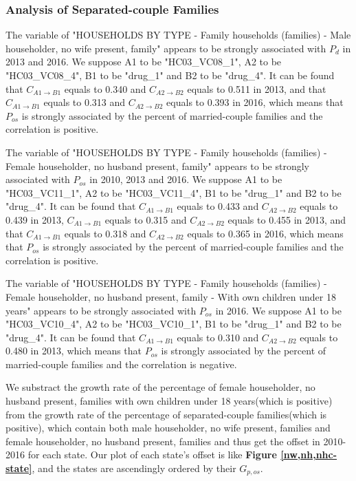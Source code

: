 \documentclass[12pt]{article}
\begin{document}
\subsubsection{Analysis of Separated-couple Families}
The variable of "HOUSEHOLDS BY TYPE - Family households (families) - Male householder, no wife present, family" appears to be strongly associated with $P_d$ in 2013 and 2016. We suppose A1 to be "HC03\_VC08\_1", A2 to be "HC03\_VC08\_4", B1 to be "drug\_1" and B2 to be "drug\_4". It can be found that $C_{A1 \to B1}$ equals to 0.340 and $C_{A2 \to B2}$ equals to 0.511 in 2013, and that $C_{A1 \to B1}$ equals to 0.313 and $C_{A2 \to B2}$ equals to 0.393 in 2016, which means that $P_{os}$ is strongly associated by the percent of married-couple families and the correlation is positive. 

The variable of "HOUSEHOLDS BY TYPE - Family households (families) - Female householder, no husband present, family" appears to be strongly associated with $P_{os}$ in 2010, 2013 and 2016. We suppose A1 to be "HC03\_VC11\_1", A2 to be "HC03\_VC11\_4", B1 to be "drug\_1" and B2 to be "drug\_4". It can be found that $C_{A1 \to B1}$ equals to 0.433 and $C_{A2 \to B2}$ equals to 0.439 in 2013, $C_{A1 \to B1}$ equals to 0.315 and $C_{A2 \to B2}$ equals to 0.455 in 2013, and that $C_{A1 \to B1}$ equals to 0.318 and $C_{A2 \to B2}$ equals to 0.365 in 2016, which means that $P_{os}$ is strongly associated by the percent of married-couple families and the correlation is positive. 

The variable of "HOUSEHOLDS BY TYPE - Family households (families) - Female householder, no husband present, family - With own children under 18 years" appears to be strongly associated with $P_{os}$ in 2016. We suppose A1 to be "HC03\_VC10\_4", A2 to be "HC03\_VC10\_1", B1 to be "drug\_1" and B2 to be "drug\_4". It can be found that $C_{A1 \to B1}$ equals to 0.310 and $C_{A2 \to B2}$ equals to 0.480 in 2013, which means that $P_{os}$ is strongly associated by the percent of married-couple families and the correlation is negative. 

We substract the growth rate of the percentage of female householder, no husband present, families with own children under 18 years(which is positive) from the growth rate of the percentage of separated-couple families(which is positive), which contain both male householder, no wife present, families and female householder, no husband present, families and thus get the offset in 2010-2016 for each state. Our plot of each state's offset is like \textbf{Figure \ref{nw,nh,nhc-state}}, and the states are ascendingly ordered by their $G_{p,os}$.
\end{document}
